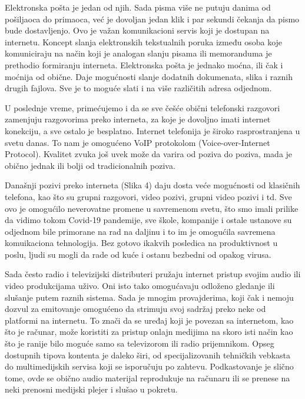 \documentclass[10pt]{article}
\begin{document}
	Elektronska pošta je jedan od njih. Sada pisma više ne putuju danima od pošiljaoca do primaoca, već je dovoljan jedan klik i par sekundi čekanja da pismo bude dostavljenjo. Ovo je važan komunikacioni servis koji je dostupan na internetu. Koncept slanja elektronskih tekstualnih poruka između osoba koje komuniciraju na način koji je analogan slanju pisama ili memoranduma je prethodio formiranju interneta. Elektronska pošta je jednako moćna, ili čak i moćnija od obične. Daje mogućnosti slanje dodatnih dokumenata, slika i raznih drugih fajlova. Sve je to moguće slati i na više različitih adresa odjednom.
	
	U poslednje vreme, primećujemo i da se sve češće obični telefonski razgovori zamenjuju razgovorima preko interneta, za koje je dovoljno imati internet konekciju, a sve ostalo je besplatno. Internet telefonija je široko rasprostranjena u svetu danas. To nam je omogućeno VoIP protokolom (Voice-over-Internet Protocol). Kvalitet zvuka još uvek može da varira od poziva do poziva, mada je obično jednak ili bolji od tradicionalnih poziva.
	
    Današnji pozivi preko interneta (Slika 4) daju dosta veće mogućnosti od klasičnih telefona, kao što su grupni razgovori, video pozivi, grupni video pozivi i td. Sve ovo je omogućilo neverovatne promene u savremenom svetu, što smo imali prilike da vidimo tokom Covid-19 pandemije, sve škole, kompanije i ostale ustanove su odjednom bile primorane na rad na daljinu i to im je omogućila savremena komuikaciona tehnologija. Bez gotovo ikakvih posledica na produktivnost u poslu, ljudi su mogli da rade od kuće i ostanu bezbedni od opakog virusa. 

    Sada često radio i televizijski distributeri pružaju internet pristup svojim audio ili video produkcijama uživo. Oni isto tako omogućavaju odloženo gledanje ili slušanje putem raznih sistema. Sada je mnogim provajderima, koji čak i nemoju dozvul za emitovanje omogućeno da strimuju svoj sadržaj preko neke od platformi na internetu. To znači da se uređaj koji je povezan sa internetom, kao što je računar, može koristiti za pristup onlajn medijima na skoro isti način kao što je ranije bilo moguće samo sa televizorom ili radio prijemnikom. Opseg dostupnih tipova kontenta je daleko širi, od specijalizovanih tehničkih vebkasta do multimedijskih servisa koji se isporučuju po zahtevu. Podkastovanje je slično tome, ovde se obično audio materijal reprodukuje na računaru ili se prenese na neki prenosni medijski plejer i slušao u pokretu. 
    
\end{document}
